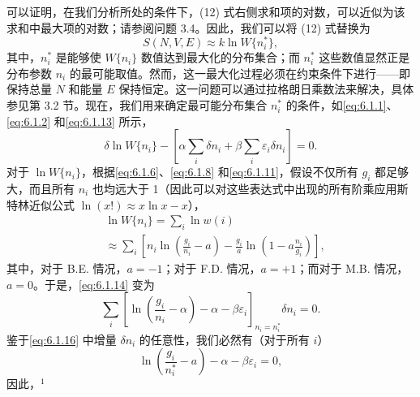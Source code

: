 可以证明，在我们分析所处的条件下，(12) 式右侧求和项的对数，可以近似为该求和中最大项的对数；请参阅问题 3.4。因此，我们可以将 (12) 式替换为
\begin{equation}\tag{6.1.11}\label{eq:6.1.11}
S ( N , V , E ) \approx k \ln W \{ n _ { i } ^{*} \} ,
\end{equation}
其中，\(n_{i}^{*}\) 是能够使 \(W\{n_{i}\}\) 数值达到最大化的分布集合；而 \(n_{i}^{*}\) 这些数值显然正是分布参数 \(n_{i}\) 的最可能取值。然而，这一最大化过程必须在约束条件下进行——即保持总量 \(N\) 和能量 \(E\) 保持恒定。这一问题可以通过拉格朗日乘数法来解决，具体参见第 3.2 节。现在，我们用来确定最可能分布集合 \(n_{i}^{*}\) 的条件，如\autoref{eq:6.1.1}、\autoref{eq:6.1.2} 和\autoref{eq:6.1.13} 所示，
\begin{equation}\tag{6.1.12}\label{eq:6.1.12}
\delta \ln W \{ n _ { i } \} - \left[ \alpha \sum _ { i } \delta n _ { i } + \beta \sum _ { i } \varepsilon _ { i } \delta n _ { i } \right] = 0 .
\end{equation}
对于 \(\ln W\{n_i\}\)，根据\autoref{eq:6.1.6}、\autoref{eq:6.1.8} 和\autoref{eq:6.1.11}，假设不仅所有 \(g_i\) 都足够大，而且所有 \(n_i\) 也均远大于 1（因此可以对这些表达式中出现的所有阶乘应用斯特林近似公式 \(\ln(x!) \approx x \ln x - x\)），
\begin{equation}\tag{6.1.13}\label{eq:6.1.13}
\begin{array}{rl} & { \ln W \{ n _ { i } \} = \sum _ { i } \ln w ( i ) } \\& {  \approx \sum _ { i } \left[ n _ { i } \ln \left( \frac { g _ { i } } { n _ { i } } - a \right) - \frac { g _ { i } } { a } \ln \left( 1 - a \frac { n _ { i } } { g _ { i } } \right) \right] , } \end{array}
\end{equation}
其中，对于 B.E. 情况，\(a = -1\)；对于 F.D. 情况，\(a = +1\)；而对于 M.B. 情况，\(a = 0\)。于是，\autoref{eq:6.1.14} 变为
\begin{equation}\tag{6.1.14}\label{eq:6.1.14}
\sum _ { i } \left[ \ln \left( \frac { g _ { i } } { n _ { i } } - \alpha \right) - \alpha - \beta \varepsilon _ { i } \right] _ { n _ { i } = n _ { i } ^{*} } \delta n _ { i } = 0 .
\end{equation}
鉴于\autoref{eq:6.1.16} 中增量 \(\delta n_{i}\) 的任意性，我们必然有（对于所有 \(i\)）
\begin{equation}\tag{6.1.15}\label{eq:6.1.15}
\ln \left( \frac { g _ { i } } { n _ { i } ^{*} } - a \right) - \alpha - \beta \varepsilon _ { i } = 0 ,
\end{equation}
因此，\(^{1}\)
